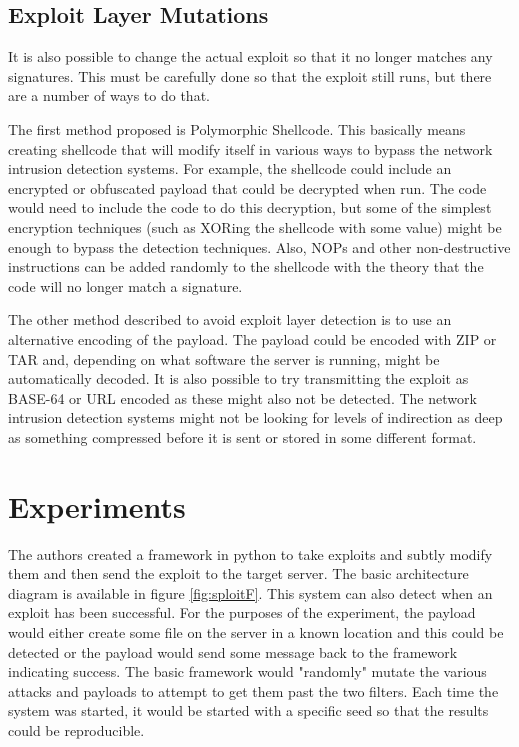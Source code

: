 \documentclass{reading_glasses}
\begin{document}
\subsection{Exploit Layer Mutations}
It is also possible to change the actual exploit so that it no longer matches any signatures.  This must be carefully done so that the exploit still runs, but there are a number of ways to do that.  \cite{vigna2004testing}

The first method proposed is Polymorphic Shellcode.  This basically means creating shellcode that will modify itself in various ways to bypass the network intrusion detection systems.  For example, the shellcode could include an encrypted or obfuscated payload that could be decrypted when run.  The code would need to include the code to do this decryption, but some of the simplest encryption techniques (such as XORing the shellcode with some value) might be enough to bypass the detection techniques.  Also, NOPs and other non-destructive instructions can be added randomly to the shellcode with the theory that the code will no longer match a signature.  \cite{vigna2004testing}

The other method described to avoid exploit layer detection is to use an alternative encoding of the payload.  The payload could be encoded with ZIP or TAR and, depending on what software the server is running, might be automatically decoded.  It is also possible to try transmitting the exploit as BASE-64 or URL encoded as these might also not be detected.  The network intrusion detection systems might not be looking for levels of indirection as deep as something compressed before it is sent or stored in some different format. \cite{vigna2004testing}

\section{Experiments}
The authors created a framework in python to take exploits and subtly modify them and then send the exploit to the target server. The basic architecture diagram is available in figure \ref{fig:sploitF}.  This system can also detect when an exploit has been successful.  For the purposes of the experiment, the payload would either create some file on the server in a known location and this could be detected or the payload would send some message back to the framework indicating success. The basic framework would "randomly" mutate the various attacks and payloads to attempt to get them past the two filters.  Each time the system was started, it would be started with a specific seed so that the results could be reproducible. \cite{vigna2004testing}
\end{document}
